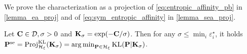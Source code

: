 We prove the characterization as a projection of \eqref{eq:entropic_affinity_pb}  in \cref{lemma_ea_proj} and of \eqref{eq:sym_entropic_affinity} in \cref{lemma_sea_proj}.

\begin{lemma}\label{lemma_ea_proj}
    Let $\mathbf{C} \in \mathcal{D}, \sigma >0$ and $\mathbf{K}_\sigma = \exp(-\mathbf{C}/\sigma)$. Then for any $\sigma \leq \min_i \varepsilon^\star_i$, it holds $\mathbf{P}^{\mathrm{se}} = \operatorname{Proj}^{\operatorname{\operatorname{KL}}}_{\mathcal{H}_{\xi}}(\mathbf{K}_{\sigma}) =  \operatorname*{arg\,min}_{\mathbf{P} \in \mathcal{H}_{\xi} } \operatorname{KL}(\mathbf{P} | \mathbf{K}_\sigma)$.
\end{lemma}

